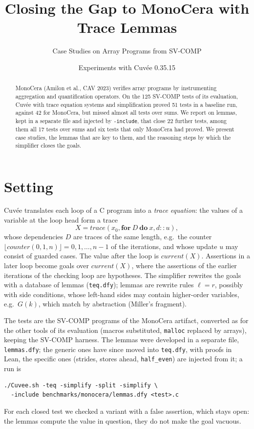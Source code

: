 \documentclass[sigconf,nonacm]{acmart}
\newcommand{\cuvee}{Cuv\'ee}
\newcommand{\code}[1]{\texttt{#1}}
\begin{document}
\title{Closing the Gap to MonoCera with Trace Lemmas}
\subtitle{Case Studies on Array Programs from SV-COMP}
\author{Experiments with \cuvee{} 0.35.15}

\begin{abstract}
MonoCera (Amilon et al., CAV 2023) verifies array programs by instrumenting
aggregation and quantification operators. On the 125 SV-COMP tests of its
evaluation, \cuvee{} with trace equation systems and simplification proved 51
tests in a baseline run, against 42 for MonoCera, but missed almost all tests
over sums. We report on lemmas, kept in a separate file and injected by
\code{-include}, that close 22 further tests, among them all 17 tests over
sums and six tests that only MonoCera had proved. We present case studies, the
lemmas that are key to them, and the reasoning steps by which the simplifier
closes the goals.
\end{abstract}

\maketitle

\section{Setting}

\cuvee{} translates each loop of a C program into a \emph{trace equation}:
the values of a variable at the loop head form a trace
\[
X = \mathit{trace}(x_0, \mathbf{for}~D~\mathbf{do}~x, d \mathrel{::} u),
\]
whose dependencies $D$ are traces of the same length, e.g.\ the counter
$\lfloor \mathit{counter}(0,1,n)\rfloor = 0, 1, \ldots, n-1$ of the
iterations, and whose update $u$ may consist of guarded cases. The value after
the loop is $\mathit{current}(X)$. Assertions in a later loop become goals
over $\mathit{current}(X)$, where the assertions of the earlier iterations of
the checking loop are hypotheses. The simplifier rewrites the goals with a
database of lemmas (\code{teq.dfy}); lemmas are rewrite rules $\ell = r$,
possibly with side conditions, whose left-hand sides may contain higher-order
variables, e.g.\ $G(k)$, which match by abstraction (Miller's fragment).

The tests are the SV-COMP programs of the MonoCera artifact, converted as for
the other tools of its evaluation (macros substituted, \code{malloc} replaced
by arrays), keeping the SV-COMP harness. The lemmas were developed in a
separate file, \code{lemmas.dfy}; the generic ones have since moved into
\code{teq.dfy}, with proofs in Lean, the specific ones (strides, stores
ahead, \code{half\_even}) are injected from it; a run is
\begin{lstlisting}
./Cuvee.sh -teq -simplify -split -simplify \
  -include benchmarks/monocera/lemmas.dfy <test>.c
\end{lstlisting}
For each closed test we checked a variant with a false assertion, which stays
open: the lemmas compute the value in question, they do not make the goal
vacuous.
\end{document}
